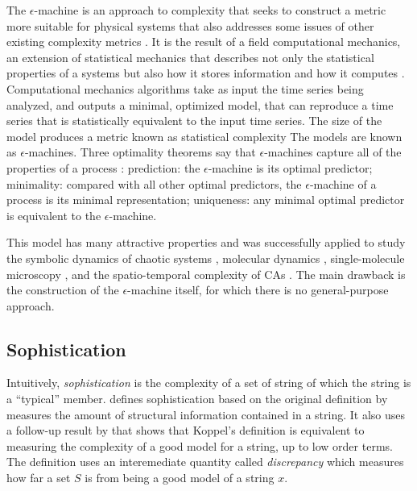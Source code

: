 The $\epsilon$-machine is an approach to complexity that seeks to construct a
metric more suitable for physical systems that also addresses some issues of
other existing complexity metrics \parencite{crutchfieldOrderChaos2012}. It is
the result of a field computational mechanics, an extension of statistical
mechanics that describes not only the statistical properties of a systems but
also how it stores information and how it computes
\parencite{crutchfieldInferringStatisticalComplexity1989,
  crutchfieldCalculiEmergenceComputation1994,
  feldmanMeasuresStatisticalComplexity1998, crutchfieldOrderChaos2012}.
Computational mechanics algorithms take as input the time series being analyzed,
and outputs a minimal, optimized model, that can reproduce a time series that is
statistically equivalent to the input time series. The size of the model
produces a metric known as statistical complexity The models are known as
$\epsilon$-machines. Three optimality theorems say that $\epsilon$-machines
capture all of the properties of a process
\parencite{crutchfieldInferringStatisticalComplexity1989,
  crutchfieldThermodynamicDepthCausal1999,
  shaliziComputationalMechanicsPattern2001}: prediction: the $\epsilon$-machine
is its optimal predictor; minimality: compared with all other optimal
predictors, the $\epsilon$-machine of a process is its minimal representation;
uniqueness: any minimal optimal predictor is equivalent to the
$\epsilon$-machine.

This model has many attractive properties and was successfully applied to study
the symbolic dynamics of chaotic systems
\parencite{crutchfieldCalculiEmergenceComputation1994}, molecular dynamics
\parencite{ryabovComputationalMechanicsMolecular2011}, single-molecule
microscopy \parencite{kellyNewMethodInferring2012}, and the spatio-temporal
complexity of \acp{CA} \parencite{crutchfieldTurbulentPatternBases1993,
  hansonComputationalMechanicsCellular1997,
  shaliziQuantifyingSelfOrganizationOptimal2004}. The main drawback is the
construction of the $\epsilon$-machine itself, for which there is no
general-purpose approach.

\subsection{Sophistication}

Intuitively, \emph{sophistication} is the complexity of a set of string of which
the string is a ``typical'' member.
\textcite{motaSophisticationRandomnessDeficiency2013} defines sophistication
based on the original definition by \textcite{koppelStructure1988,
  koppelAlmostMachineindependentTheory1991a} measures the amount of structural
information contained in a string. It also uses a follow-up result by
\parencite{vitanyiMeaningfulInformation2006} that shows that Koppel's definition
is equivalent to measuring the complexity of a good model for a string, up to
low order terms. The definition uses an interemediate quantity called
\emph{discrepancy} which measures how far a set $S$ is from being a good model
of a string $x$.

